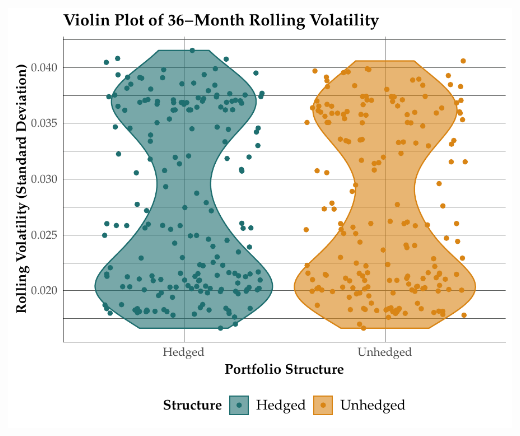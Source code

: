\documentclass[11pt,preprint, authoryear]{elsarticle}
\numberwithin{equation}{section}
\numberwithin{figure}{section}
\numberwithin{table}{section}
\begin{document}
\includegraphics{Question-2_files/figure-latex/unnamed-chunk-2-1.pdf}


\end{document}
